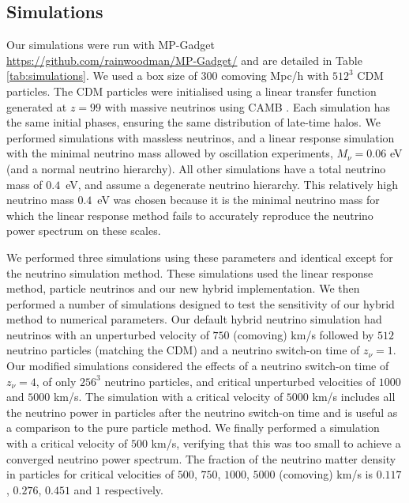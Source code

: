 \documentclass[useAMS, usenatbib]{mnras}
\begin{document}
\subsection{Simulations}
\label{sec:simulations}

Our simulations were run with MP-Gadget \url{https://github.com/rainwoodman/MP-Gadget/} and are detailed in Table \ref{tab:simulations}. We used a box size of $300$ comoving Mpc/h with $512^3$ CDM particles.
The CDM particles were initialised using a linear transfer function generated at $z=99$ with massive neutrinos using CAMB \citep{CAMB_neutrinos}. Each simulation has the same initial phases, ensuring the same distribution of late-time halos. We performed simulations with massless neutrinos, and a linear response simulation with the minimal neutrino mass allowed by oscillation experiments, $M_\nu = 0.06$ eV (and a normal neutrino hierarchy). All other simulations have a total neutrino mass of $0.4$~eV, and assume a degenerate neutrino hierarchy. This relatively high neutrino mass $0.4$~eV was chosen because it is the minimal neutrino mass for which the linear response method fails to accurately reproduce the neutrino power spectrum on these scales.

We performed three simulations using these parameters and identical except for the neutrino simulation method. These simulations used the linear response method, particle neutrinos and our new hybrid implementation. We then performed a number of simulations designed to test the sensitivity of our hybrid method to numerical parameters. Our default hybrid neutrino simulation had neutrinos with an unperturbed velocity of $750$ (comoving) km/s followed by $512$ neutrino particles (matching the CDM) and a neutrino switch-on time of $z_\nu = 1$. Our modified simulations considered the effects of a neutrino switch-on time of $z_\nu = 4$, of only $256^3$ neutrino particles, and critical unperturbed velocities of $1000$ and $5000$ km/s. The simulation with a critical velocity of $5000$ km/s includes all the neutrino power in particles after the neutrino switch-on time and is useful as a comparison to the pure particle method. We finally performed a simulation with a critical velocity of $500$ km/s, verifying that this was too small to achieve a converged neutrino power spectrum.
The fraction of the neutrino matter density in particles for critical velocities of $500$, $750$, $1000$, $5000$ (comoving) km/s is $0.117$, $0.276$, $0.451$ and $1$ respectively.
\end{document}
